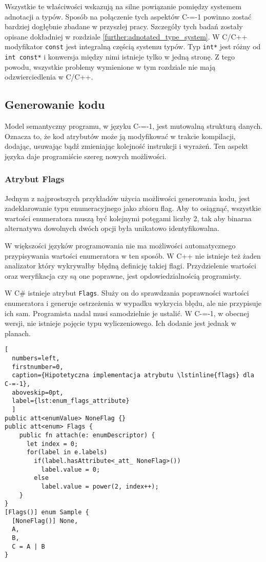 Wszystkie te właściwości wskazują na silne powiązanie pomiędzy systemem adnotacji a typów.
Sposób na połączenie tych aspektów C-=-1 powinno zostać bardziej dogłębnie zbadane w przyszłej pracy.
Szczegóły tych badań zostały opisane dokładniej w rozdziale \ref{further:adnotated_type_system}.
W C/C++ modyfikator \lstinline{const} jest integralną częścią systemu typów.
Typ \lstinline{int*} jest różny od \lstinline{int const*} i konwersja między nimi istnieje tylko w jedną stronę.
Z tego powodu, wszystkie problemy wymienione w tym rozdziale nie mają odzwierciedlenia w C/C++.

\subsection{Generowanie kodu}
\label{code_generation}

Model semantyczny programu, w języku C-=-1, jest mutowalną strukturą danych.
Oznacza to, że kod atrybutów może ją modyfikować w trakcie kompilacji, dodając, usuwając bądź zmieniając kolejność instrukcji i wyrażeń.
Ten aspekt języka daje programiście szereg nowych możliwości.

\subsubsection{Atrybut Flags}

Jednym z najprostszych przykładów użycia możliwości generowania kodu, jest zadeklarowanie typu enumeracyjnego jako zbioru flag.
Aby to osiągnąć, wszystkie wartości enumeratora muszą być kolejnymi potęgami liczby 2, tak aby binarna alternatywa dowolnych dwóch opcji była unikatowo identyfikowalna.

W większości języków programowania nie ma możliwości automatycznego przypisywania wartości enumeratora w ten sposób.
W C++ nie istnieje też żaden analizator który wykrywałby błędną definicję takiej flagi.
Przydzielenie wartości oraz weryfikacja czy są one poprawne, jest opdowiedzialnością programisty.

W C\# istnieje atrybut \lstinline{Flags}.
Służy on do sprawdzania poprawności wartości enumeratora i generuje ostrzeżenia w wypadku wykrycia błędu, ale nie przypisuje ich sam.
Programista nadal musi samodzielnie je ustalić.
W C-=-1, w obecnej wersji, nie istnieje pojęcie typu wyliczeniowego.
Ich dodanie jest jednak w planach.

\begin{minipage}{\textwidth}
\begin{lstlisting}[
  numbers=left,
  firstnumber=0,
  caption={Hipotetyczna implementacja atrybutu \lstinline{flags} dla C-=-1},
  aboveskip=0pt,
  label={lst:enum_flags_attribute}
  ]
public att<enumValue> NoneFlag {}
public att<enum> Flags {
    public fn attach(e: enumDescriptor) {
      let index = 0;
      for(label in e.labels)
        if(label.hasAttribute<_att_ NoneFlag>())
          label.value = 0;
        else
          label.value = power(2, index++);
    }
}
[Flags()] enum Sample {
  [NoneFlag()] None,
  A,
  B,
  C = A | B
}
\end{lstlisting}
\end{minipage}

